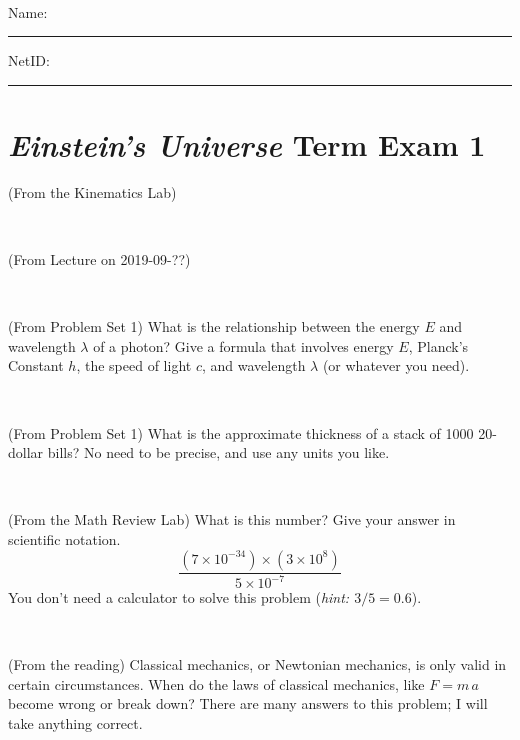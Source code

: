 \documentclass[12pt, letterpaper]{article}
\begin{document}
\vfill ~


\cleardoublepage



\noindent
Name: \rule[-1ex]{0.60\textwidth}{0.1pt}
NetID: \rule[-1ex]{0.20\textwidth}{0.1pt}

\section*{\textsl{Einstein's Universe} Term Exam 1}
\setcounter{problem}{1}


\begin{problem} (From the Kinematics Lab)

\end{problem}


\vfill ~

\begin{problem} (From Lecture on 2019-09-??)
\end{problem}


\vfill ~

\begin{problem} (From Problem Set 1)
What is the relationship between the energy $E$ and wavelength
$\lambda$ of a photon? Give a formula that involves energy $E$,
Planck's Constant $h$, the speed of light $c$, and wavelength
$\lambda$ (or whatever you need).
\end{problem}

\vfill ~

\begin{problem} (From Problem Set 1)
What is the approximate thickness of a stack of 1000 20-dollar bills?
No need to be precise, and use any units you like.
\end{problem}


\vfill ~


\clearpage


\begin{problem} (From the Math Review Lab)
What is this number? Give your answer in scientific notation.
$$
\frac{(7\times10^{-34})\times(3\times10^8)}{5\times10^{-7}}
$$
You don't need a calculator to solve this problem (\textit{hint: $3/5=0.6$}).
\end{problem}


\vfill ~

\begin{problem} (From the reading)
Classical mechanics, or Newtonian mechanics, is only valid in certain
circumstances. When do the laws of classical mechanics, like $F =
m\,a$ become wrong or break down? There are many answers to this
problem; I will take anything correct.
\end{problem}
\end{document}
